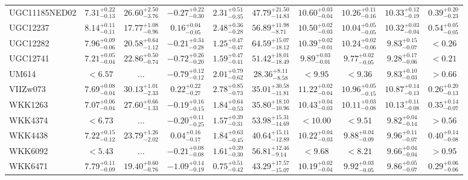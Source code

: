 \documentclass[onecolumn]{mn2e}
\begin{document}
\begin{landscape}
{\begin{center}
\begin{longtable}{lccccccccc}
UGC11185NED02 & $7.31_{-0.13}^{+0.22}$ & $26.60_{-3.76}^{+2.50}$ & $-0.27_{-0.30}^{+0.22}$ & $2.31_{-0.35}^{+0.51}$ &$47.79_{-14.83}^{+21.50}$ & $10.60_{-0.04}^{+0.03}$ & $10.26_{-0.16}^{+0.11}$ & $10.33_{-0.19}^{+0.12}$ & $0.39_{-0.23}^{+0.20}$ \\
UGC12237 & $8.14_{-0.11}^{+0.11}$ & $17.77_{-0.96}^{+1.08}$ & $0.16_{-0.05}^{+0.04}$ & $2.48_{-0.28}^{+0.36}$ &$56.89_{-8.71}^{+11.98}$ & $10.50_{-0.03}^{+0.02}$ & $10.04_{-0.05}^{+0.05}$ & $10.32_{-0.04}^{+0.03}$ & $0.54_{-0.05}^{+0.05}$ \\
UGC12282 & $7.96_{-0.06}^{+0.09}$ & $20.58_{-1.12}^{+0.64}$ & $-0.21_{-0.28}^{+0.34}$ & $1.25_{-0.47}^{+0.47}$ &$64.59_{-18.12}^{+15.07}$ & $10.39_{-0.01}^{+0.02}$ & $10.24_{-0.06}^{+0.02}$ & $9.83_{-0.07}^{+0.15}$ & $<0.26$ \\
UGC12741 & $7.21_{-0.04}^{+0.05}$ & $22.86_{-0.74}^{+0.50}$ & $-0.72_{-0.20}^{+0.26}$ & $1.59_{-0.41}^{+0.47}$ &$51.42_{-18.49}^{+18.01}$ & $9.89_{-0.01}^{+0.03}$ & $9.77_{-0.05}^{+0.02}$ & $9.28_{-0.06}^{+0.17}$ & $<0.21$ \\
UM614 & $<6.57$ & ... & $-0.79_{-0.12}^{+0.12}$ & $2.01_{-0.62}^{+0.79}$ &$28.36_{-8.58}^{+8.11}$ & $<9.95$ & $<9.36$ & $9.83_{-0.03}^{+0.10}$ & $>0.66$ \\
VIIZw073 & $7.69_{-0.04}^{+0.08}$ & $30.13_{-2.33}^{+1.01}$ & $0.22_{-0.27}^{+0.22}$ & $2.78_{-0.73}^{+0.85}$ &$35.01_{-11.81}^{+30.58}$ & $11.22_{-0.04}^{+0.02}$ & $10.96_{-0.15}^{+0.05}$ & $10.87_{-0.13}^{+0.14}$ & $0.26_{-0.13}^{+0.20}$ \\
WKK1263 & $7.07_{-0.04}^{+0.06}$ & $27.60_{-1.33}^{+0.66}$ & $-0.19_{-0.15}^{+0.16}$ & $1.84_{-0.53}^{+0.64}$ &$35.80_{-10.96}^{+18.10}$ & $10.43_{-0.03}^{+0.04}$ & $10.11_{-0.08}^{+0.03}$ & $10.13_{-0.08}^{+0.11}$ & $0.35_{-0.07}^{+0.14}$ \\
WKK4374 & $<6.73$ & ... & $-0.20_{-0.25}^{+0.11}$ & $1.57_{-0.31}^{+0.39}$ &$53.98_{-14.69}^{+15.31}$ & $<10.00$ & $<9.51$ & $9.82_{-0.14}^{+0.04}$ & $>0.56$ \\
WKK4438 & $7.22_{-0.12}^{+0.15}$ & $23.79_{-2.02}^{+1.26}$ & $0.04_{-0.17}^{+0.16}$ & $1.84_{-0.45}^{+0.63}$ &$40.64_{-12.89}^{+15.11}$ & $10.22_{-0.03}^{+0.04}$ & $9.88_{-0.09}^{+0.04}$ & $9.96_{-0.07}^{+0.11}$ & $0.40_{-0.08}^{+0.14}$ \\
WKK6092 & $<5.43$ & ... & $-0.21_{-0.08}^{+0.08}$ & $1.61_{-0.30}^{+0.39}$ &$56.81_{-9.14}^{+12.46}$ & $<9.68$ & $<8.21$ & $9.66_{-0.04}^{+0.04}$ & $>0.95$ \\
WKK6471 & $7.79_{-0.09}^{+0.11}$ & $19.40_{-0.76}^{+0.60}$ & $-1.09_{-0.19}^{+0.14}$ & $0.75_{-0.42}^{+0.51}$ &$43.29_{-15.07}^{+17.57}$ & $10.19_{-0.04}^{+0.02}$ & $9.92_{-0.05}^{+0.03}$ & $9.86_{-0.07}^{+0.05}$ & $0.29_{-0.06}^{+0.06}$ \\
\end{longtable}
\end{center}
}
\end{landscape}
\end{document}
